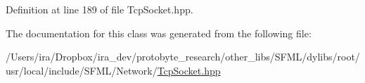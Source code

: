 Definition at line 189 of file Tcp\-Socket.\-hpp.



The documentation for this class was generated from the following file\-:\begin{DoxyCompactItemize}
\item 
/\-Users/ira/\-Dropbox/ira\-\_\-dev/protobyte\-\_\-research/other\-\_\-libs/\-S\-F\-M\-L/dylibs/root/usr/local/include/\-S\-F\-M\-L/\-Network/\hyperlink{_tcp_socket_8hpp}{Tcp\-Socket.\-hpp}\end{DoxyCompactItemize}
